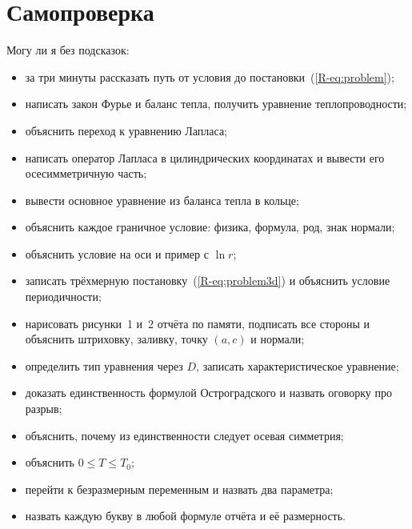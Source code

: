 \documentclass[a4paper,12pt]{article}
\renewcommand{\le}{\leqslant}
\newcommand{\rf}[1]{(\ref*{R-#1})}
\begin{document}
\section{Самопроверка}

Могу ли я без подсказок:
\begin{itemize}[label=$\square$]
  \item за три минуты рассказать путь от условия до постановки~\rf{eq:problem};
  \item написать закон Фурье и баланс тепла, получить уравнение теплопроводности;
  \item объяснить переход к уравнению Лапласа;
  \item написать оператор Лапласа в цилиндрических координатах и вывести
  его осесимметричную часть;
  \item вывести основное уравнение из баланса тепла в кольце;
  \item объяснить каждое граничное условие: физика, формула, род, знак нормали;
  \item объяснить условие на оси и пример с $\ln r$;
  \item записать трёхмерную постановку~\rf{eq:problem3d} и объяснить
  условие периодичности;
  \item нарисовать рисунки~1 и~2 отчёта по памяти, подписать все стороны и
  объяснить штриховку, заливку, точку $(a,c)$ и нормали;
  \item определить тип уравнения через $D$, записать характеристическое
  уравнение;
  \item доказать единственность формулой Остроградского и назвать оговорку
  про разрыв;
  \item объяснить, почему из единственности следует осевая симметрия;
  \item объяснить $0\le T\le T_0$;
  \item перейти к безразмерным переменным и назвать два параметра;
  \item назвать каждую букву в любой формуле отчёта и её размерность.
\end{itemize}
\end{document}
